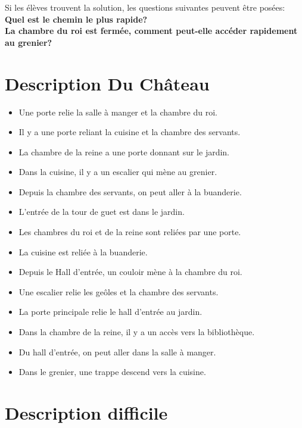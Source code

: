 \documentclass{article}
\begin{document}
Si les élèves trouvent la solution, les questions suivantes peuvent être posées:\\
\textbf{Quel est le chemin le plus rapide?}\\
\textbf{La chambre du roi est fermée, comment peut-elle accéder rapidement au grenier?}

\newpage
\section{Description Du Château}
\begin{itemize}
\item Une porte relie la salle à manger et la chambre du roi.
\item Il y a une porte reliant la cuisine et la chambre des servants.
\item La chambre de la reine a une porte donnant sur le jardin.
\item Dans la cuisine, il y a un escalier qui mène au grenier.
\item Depuis la chambre des servants, on peut aller à la buanderie.
\item L'entrée de la tour de guet est dans le jardin.
\item Les chambres du roi et de la reine sont reliées par une porte.
\item La cuisine est reliée à la buanderie.
\item Depuis le Hall d'entrée, un couloir mène à la chambre du roi.
\item Une escalier relie les geôles et la chambre des servants.
\item La porte principale relie le hall d'entrée au jardin.
\item Dans la chambre de la reine, il y a un accès vers la bibliothèque.
\item Du hall d'entrée, on peut aller dans la salle à manger.
\item Dans le grenier, une trappe descend vers la cuisine.
\end{itemize}

\newpage
\section{Description difficile}
\end{document}
